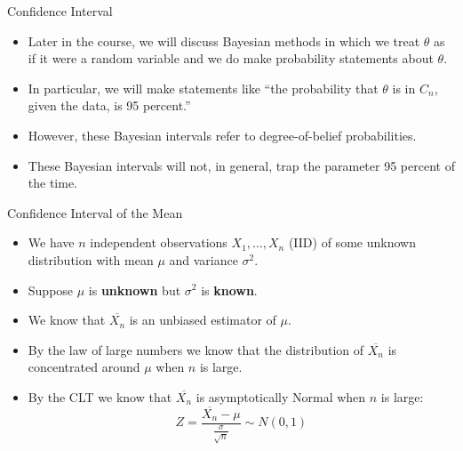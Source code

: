 \documentclass[handout]{beamer}
\begin{document}
\begin{frame}{Confidence Interval}
\scriptsize{


\begin{itemize}
 \item Later in the course, we will discuss Bayesian methods in which we treat $\theta$ as if it were a random variable and we do make probability statements about $\theta$.
\item In particular, we will make statements like ``the probability that $\theta$  is in $C_n$, given the data, is 95 percent.''
\item However, these Bayesian intervals refer to degree-of-belief probabilities. 
\item These Bayesian intervals will not, in general, trap the parameter 95 percent of the time.
 
\end{itemize}



}
 
\end{frame}


\begin{frame}{Confidence Interval of the Mean }
\scriptsize{
\begin{itemize}
 \item We have $n$ independent observations $X_1, \dots, X_n$ (IID) of some unknown distribution with mean $\mu$ and variance $\sigma^2$.
\item Suppose $\mu$ is \textbf{unknown} but $\sigma^2$ is \textbf{known}.
 \item We know that $\overline{X_{n}}$ is an unbiased estimator of $\mu$.
 \item By the law of large numbers we know that the distribution of $\overline{X_{n}}$ is concentrated around $\mu$ when $n$ is large.
 \item By the CLT we know that $\overline{X_{n}}$ is asymptotically Normal when $n$ is large: \begin{displaymath}
 Z=\frac{\overline{X_{n}}-\mu}{\frac{\sigma}{\sqrt{n}}}  \sim N(0,1)
\end{displaymath}

\end{itemize}


 }
\end{frame}
\end{document}
